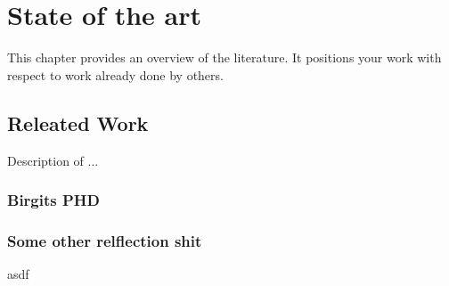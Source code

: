 \chapter{State of the art}
This chapter provides an overview of the literature. It positions your work with respect to
work already done by others.
\section{Releated Work}
Description of ...

\subsection{Birgits PHD}

\subsection{Some other relflection shit}
asdf

